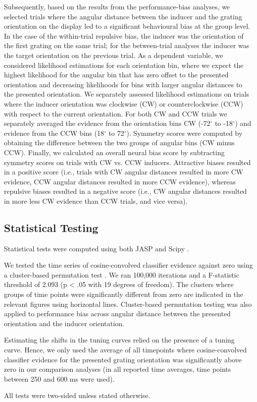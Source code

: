\documentclass{article}
\begin{document}
\begin{normalsize}
Subsequently, based on the results from the performance-bias analyses, we selected trials where the angular distance between the inducer and the grating orientation on the display led to a significant behavioural bias at the group level. In the case of the within-trial repulsive bias, the inducer was the orientation of the first grating on the same trial; for the between-trial analyses the inducer was the target orientation on the previous trial. As a dependent variable, we considered likelihood estimations for each orientation bin, where we expect the highest likelihood for the angular bin that has zero offset to the presented orientation and decreasing likelihoods for bins with larger angular distances to the presented orientation. We separately assessed likelihood estimations on trials where the inducer orientation was clockwise (CW) or counterclockwise (CCW) with respect to the current orientation. For both CW and CCW trials we separately averaged the evidence from the orientation bins CW (-72$^{\circ}$ to -18$^{\circ}$) and evidence from the CCW bins (18$^{\circ}$ to 72$^{\circ}$). Symmetry scores were computed by obtaining the difference between the two groups of angular bins (CW minus CCW). Finally, we calculated an overall neural bias score by subtracting symmetry scores on trials with CW vs. CCW inducers. Attractive biases resulted in a positive score (i.e., trials with CW angular distances resulted in more CW evidence, CCW angular distances resulted in more CCW evidence), whereas repulsive biases resulted in a negative score (i.e., CW angular distances resulted in more less CW evidence than CCW trials, and vice versa). 

\subsection{Statistical Testing}
Statistical tests were computed using both JASP \parencite{JASP2020} and Scipy \parencite{Virtanen2020}. 

We tested the time series of cosine-convolved classifier evidence against zero using a cluster-based permutation test \parencite[using MNE; ][]{Gramfort2013}. We ran 100,000 iterations and a F-statistic threshold of 2.093 (p < .05 with 19 degrees of freedom). The clusters where groups of time points were significantly different from zero are indicated in the relevant figures using horizontal lines. Cluster-based permutation testing was also applied to performance bias across angular distance between the presented orientation and the inducer orientation.


Estimating the shifts in the tuning curves relied on the presence of a tuning curve. Hence, we only used the average of all timepoints where cosine-convolved classifier evidence for the presented grating orientation was significantly above zero in our comparison analyses (in all reported time averages, time points between 250 and 600 ms were used). 

All tests were two-sided unless stated otherwise. 


\end{normalsize}
\end{document}
